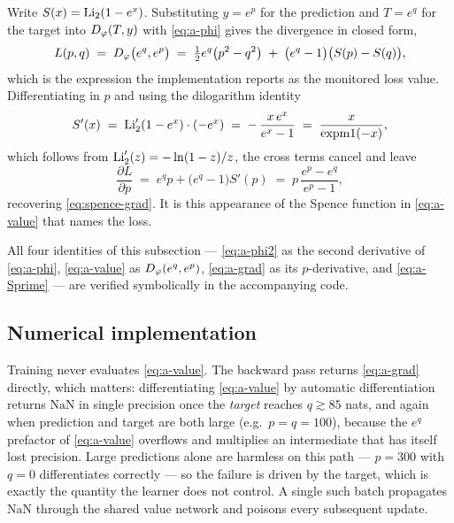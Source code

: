 Write $S(x)=\mathrm{Li}_2(1-e^{x})$. Substituting $y=e^{p}$ for the prediction and
$T=e^{q}$ for the target into $D_{\varphi}(T,y)$ with \eqref{eq:a-phi} gives the
divergence in closed form,
\begin{equation}
  L(p,q) \;=\; D_{\varphi}\big(e^{q},e^{p}\big)
  \;=\; \tfrac12 e^{q}\big(p^{2}-q^{2}\big)
        \;+\;\big(e^{q}-1\big)\big(S(p)-S(q)\big),
  \label{eq:a-value}
\end{equation}
which is the expression the implementation reports as the monitored loss
value. Differentiating in $p$ and using the dilogarithm identity
\begin{equation}
  S'(x) \;=\; \mathrm{Li}_2'(1-e^{x})\cdot(-e^{x})
        \;=\; -\,\frac{x\,e^{x}}{e^{x}-1}
        \;=\; \frac{x}{\mathrm{expm1}(-x)},
  \label{eq:a-Sprime}
\end{equation}
which follows from $\mathrm{Li}_2'(z)=-\ln(1-z)/z$, the cross terms cancel and leave
\begin{equation}
  \frac{\partial L}{\partial p}
  \;=\; e^{q}p + \big(e^{q}-1\big)S'(p)
  \;=\; p\,\frac{e^{p}-e^{q}}{e^{p}-1},
  \label{eq:a-grad}
\end{equation}
recovering \eqref{eq:spence-grad}. It is this appearance of the Spence
function in \eqref{eq:a-value} that names the loss.

All four identities of this subsection --- \eqref{eq:a-phi2} as the second
derivative of \eqref{eq:a-phi}, \eqref{eq:a-value} as $D_{\varphi}(e^{q},e^{p})$,
\eqref{eq:a-grad} as its $p$-derivative, and \eqref{eq:a-Sprime} --- are
verified symbolically in the accompanying code.

\subsection{Numerical implementation}
\label{subsec:a-numerics}

Training never evaluates \eqref{eq:a-value}. The backward pass returns
\eqref{eq:a-grad} directly, which matters: differentiating \eqref{eq:a-value}
by automatic differentiation returns $\mathrm{NaN}$ in single precision once
the \emph{target} reaches $q\gtrsim85$ nats, and again when prediction and
target are both large (e.g.\ $p=q=100$), because the $e^{q}$ prefactor of
\eqref{eq:a-value} overflows and multiplies an intermediate that has itself
lost precision. Large predictions alone are harmless on this path --- $p=300$
with $q=0$ differentiates correctly --- so the failure is driven by the
target, which is exactly the quantity the learner does not control. A single
such batch propagates $\mathrm{NaN}$ through the shared value network and
poisons every subsequent update.

